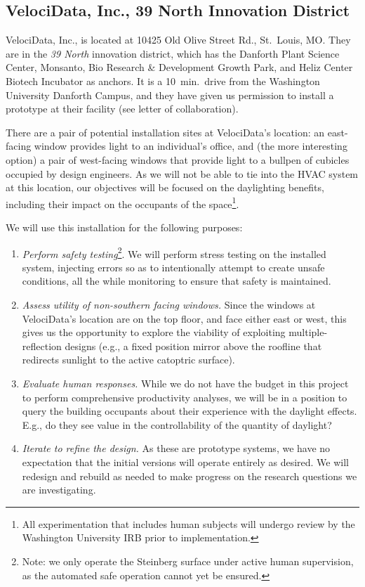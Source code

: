 \subsection{VelociData, Inc., 39 North Innovation District}

VelociData, Inc., is located at 10425 Old Olive Street Rd., St.~Louis, MO.
They are in the \emph{39 North} innovation district, which has the Danforth
Plant Science Center, Monsanto, Bio Research \& Development Growth Park,
and Heliz Center Biotech Incubator as anchors. It is a 10~min.~drive from
the Washington University Danforth Campus, and they have given us
permission to install a prototype at their facility (see letter
of collaboration).

There are a pair of potential installation sites at VelociData's location:
an east-facing window provides light to an individual's office, and
(the more interesting option) a pair of west-facing windows that provide
light to a bullpen of cubicles occupied by design engineers.
As we will not be able to tie into the HVAC system at this location, our
objectives will be focused on the daylighting benefits, including their
impact on the occupants of the space\footnote{All experimentation that
includes human subjects will undergo review by the Washington University
IRB prior to implementation.}.

We will use this installation for the following purposes:

\begin{enumerate}

\item \emph{Perform safety testing}\footnote{Note: we only operate the Steinberg
surface under active human supervision, as the automated safe operation cannot yet be 
ensured.}.
We will perform stress testing on the installed system, injecting errors so as to
intentionally attempt to create unsafe conditions, all the while monitoring
to ensure that safety is maintained.

\item \emph{Assess utility of non-southern facing windows.}
Since the windows at VelociData's location are on the top floor, and face
either east or west, this gives us the opportunity to explore the viability
of exploiting multiple-reflection designs
(e.g., a fixed position mirror above the
roofline that redirects sunlight to the active catoptric surface).

\item \emph{Evaluate human responses.}
While we do not have the budget in this project to perform
comprehensive productivity analyses, we will be in a position to
query the building occupants about their experience with the
daylight effects. E.g., do they see value in the controllability
of the quantity of daylight?

\item \emph{Iterate to refine the design.}
As these are prototype systems, we have no expectation that the
initial versions will operate entirely as desired.  We will redesign
and rebuild as needed to make progress on the research questions we
are investigating.

\end{enumerate}

